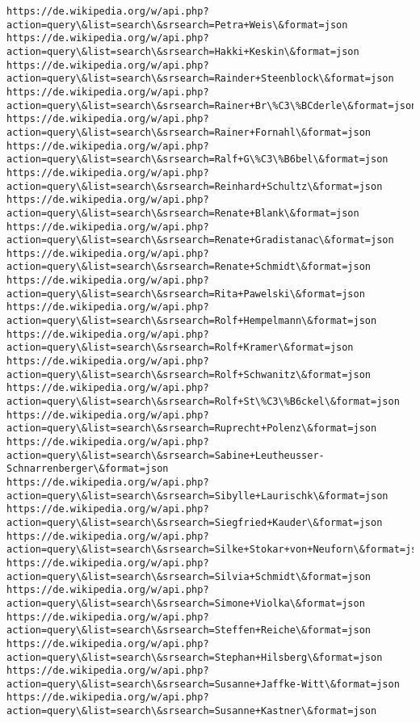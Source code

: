 \documentclass[11pt]{article}
\begin{document}
\begin{Verbatim}[commandchars=\\\{\}]
https://de.wikipedia.org/w/api.php?action=query\&list=search\&srsearch=Petra+Weis\&format=json
https://de.wikipedia.org/w/api.php?action=query\&list=search\&srsearch=Hakki+Keskin\&format=json
https://de.wikipedia.org/w/api.php?action=query\&list=search\&srsearch=Rainder+Steenblock\&format=json
https://de.wikipedia.org/w/api.php?action=query\&list=search\&srsearch=Rainer+Br\%C3\%BCderle\&format=json
https://de.wikipedia.org/w/api.php?action=query\&list=search\&srsearch=Rainer+Fornahl\&format=json
https://de.wikipedia.org/w/api.php?action=query\&list=search\&srsearch=Ralf+G\%C3\%B6bel\&format=json
https://de.wikipedia.org/w/api.php?action=query\&list=search\&srsearch=Reinhard+Schultz\&format=json
https://de.wikipedia.org/w/api.php?action=query\&list=search\&srsearch=Renate+Blank\&format=json
https://de.wikipedia.org/w/api.php?action=query\&list=search\&srsearch=Renate+Gradistanac\&format=json
https://de.wikipedia.org/w/api.php?action=query\&list=search\&srsearch=Renate+Schmidt\&format=json
https://de.wikipedia.org/w/api.php?action=query\&list=search\&srsearch=Rita+Pawelski\&format=json
https://de.wikipedia.org/w/api.php?action=query\&list=search\&srsearch=Rolf+Hempelmann\&format=json
https://de.wikipedia.org/w/api.php?action=query\&list=search\&srsearch=Rolf+Kramer\&format=json
https://de.wikipedia.org/w/api.php?action=query\&list=search\&srsearch=Rolf+Schwanitz\&format=json
https://de.wikipedia.org/w/api.php?action=query\&list=search\&srsearch=Rolf+St\%C3\%B6ckel\&format=json
https://de.wikipedia.org/w/api.php?action=query\&list=search\&srsearch=Ruprecht+Polenz\&format=json
https://de.wikipedia.org/w/api.php?action=query\&list=search\&srsearch=Sabine+Leutheusser-Schnarrenberger\&format=json
https://de.wikipedia.org/w/api.php?action=query\&list=search\&srsearch=Sibylle+Laurischk\&format=json
https://de.wikipedia.org/w/api.php?action=query\&list=search\&srsearch=Siegfried+Kauder\&format=json
https://de.wikipedia.org/w/api.php?action=query\&list=search\&srsearch=Silke+Stokar+von+Neuforn\&format=json
https://de.wikipedia.org/w/api.php?action=query\&list=search\&srsearch=Silvia+Schmidt\&format=json
https://de.wikipedia.org/w/api.php?action=query\&list=search\&srsearch=Simone+Violka\&format=json
https://de.wikipedia.org/w/api.php?action=query\&list=search\&srsearch=Steffen+Reiche\&format=json
https://de.wikipedia.org/w/api.php?action=query\&list=search\&srsearch=Stephan+Hilsberg\&format=json
https://de.wikipedia.org/w/api.php?action=query\&list=search\&srsearch=Susanne+Jaffke-Witt\&format=json
https://de.wikipedia.org/w/api.php?action=query\&list=search\&srsearch=Susanne+Kastner\&format=json

\end{Verbatim}
\end{document}
